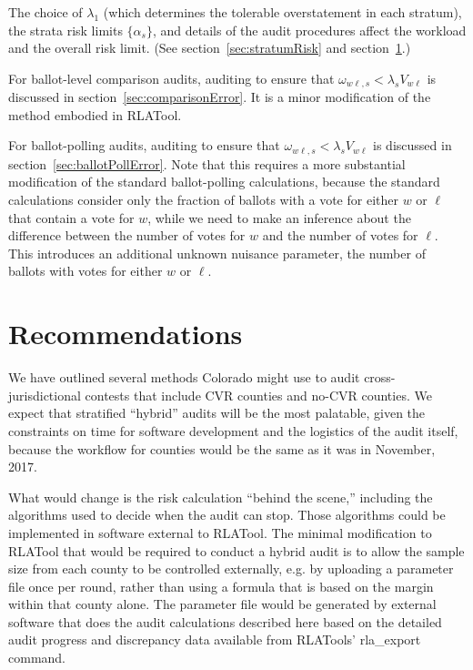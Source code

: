 \documentclass[12pt]{article}
\begin{document}
The choice of $\lambda_1$ (which determines the tolerable overstatement in each
stratum), the strata risk limits $\{\alpha_s\}$, and details of the
audit procedures affect the workload and the overall risk limit.
(See section~\ref{sec:stratumRisk} and section~\ref{sec:recommendations}.)

For ballot-level comparison audits, auditing to ensure that $\omega_{w\ell,s} < \lambda_s V_{w\ell}$
is discussed in section~\ref{sec:comparisonError}.  It is a minor modification of the method
embodied in RLATool.

For ballot-polling audits, auditing to ensure that $\omega_{w\ell,s} < \lambda_s V_{w\ell}$ is discussed in section~\ref{sec:ballotPollError}.
Note that this requires a more substantial modification of the standard ballot-polling calculations,
because the standard calculations consider only the fraction of ballots with a vote for either 
$w$ or $\ell$ that contain a vote for $w$, while we need to make an inference about the 
difference between the number of votes for $w$ and the number of votes for $\ell$.
This introduces an additional unknown nuisance parameter, the number of ballots with votes for either
$w$ or $\ell$.







\section{Recommendations} \label{sec:recommendations}

We have outlined several methods Colorado might use to audit cross-jurisdictional contests
that include CVR counties and no-CVR counties.
We expect that stratified ``hybrid'' audits will be the most palatable,
given the constraints on time for software development and the logistics
of the audit itself, because the workflow for counties would be the same
as it was in November, 2017.

What would change is the risk calculation ``behind the scene,'' including the
algorithms used to decide when the audit can stop.
Those algorithms could be implemented in software external to RLATool.
The minimal modification to RLATool that would be required to conduct
a hybrid audit is to allow the sample size from each county to be controlled externally,
e.g. by uploading a parameter file once per round,
rather than using a formula that is based on the margin within that county alone.
The parameter file would be generated by external software that does the
audit calculations described here based on the detailed
audit progress and discrepancy data available from RLATools' rla\_export command.
\end{document}
